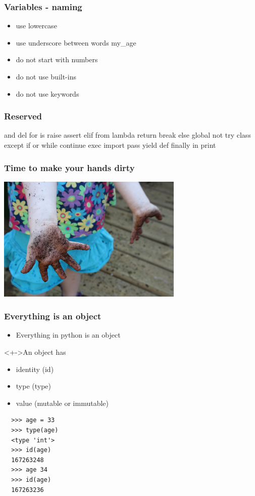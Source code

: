\documentclass{beamer}
\begin{document}
\begin{frame}[fragile]
 \frametitle{Variables - naming}
 \begin{itemize}
  \item use lowercase
  \item use underscore between words  my\_age
  \item do not start with numbers
  \item do not use built-ins
  \item do not use keywords
 \end{itemize}

\end{frame}

\begin{frame}
 \frametitle{Reserved}
 \color{red}
and       del       for       is        raise     
assert    elif      from      lambda    return   
break     else      global    not       try     
class     except    if        or        while  
continue  exec      import    pass      yield 
def       finally   in        print
\end{frame}

\begin{frame}
 \frametitle{Time to make your hands dirty}
 \begin{center}
  \includegraphics[height=6cm]{hd.jpg}
 \end{center}
\end{frame}

\begin{frame}[fragile]
 \frametitle{Everything is an object}
 \begin{itemize}
  \item Everything in python is an object 
 \end{itemize}
 \begin{block}<+->{An object has}
  \begin{itemize}
   \item identity (id)
   \item type (type)
   \item value (mutable or immutable)
  \end{itemize}
 \end{block}
 \begin{verbatim}
  >>> age = 33
  >>> type(age)
  <type 'int'>
  >>> id(age)
  167263248
  >>> age 34
  >>> id(age)
  167263236
 \end{verbatim}

\end{frame}
\end{document}
